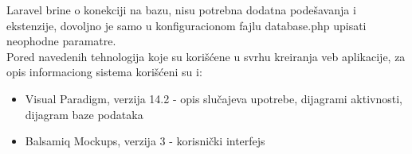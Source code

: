 \documentclass{article}
\begin{document}
Laravel brine o konekciji na bazu, nisu potrebna dodatna podešavanja i ekstenzije, dovoljno je samo u konfiguracionom fajlu database.php upisati neophodne paramatre. \\

Pored navedenih tehnologija koje su korišćene u svrhu kreiranja veb aplikacije, za opis informaciong sistema korišćeni su i:
\begin{itemize}
	\item Visual Paradigm, verzija 14.2 - opis slučajeva upotrebe, dijagrami aktivnosti, dijagram baze podataka
	\item Balsamiq Mockups, verzija 3 - korisnički interfejs
\end{itemize}
\end{document}
